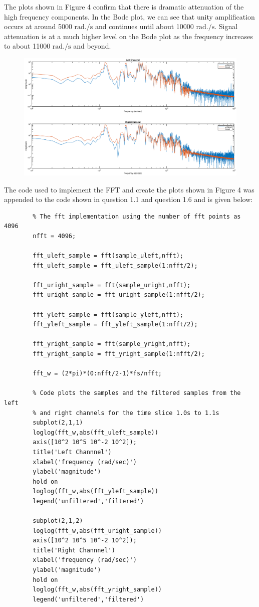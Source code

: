 \documentclass{article}
\begin{document}
	The plots shown in Figure 4 confirm that there is dramatic attenuation of the high frequency components. In the Bode plot, we can see that unity amplification occurs at around 5000 $\si{\radian.\per\second}$ and continues until about 10000 $\si{\radian.\per\second}$. Signal attenuation is at a much higher level on the Bode plot as the frequency increases to about 11000 $\si{\radian.\per\second}$ and beyond. 
	
	 \begin{figure}[H]
	 	\hspace*{-1.5cm}
	 	\includegraphics[scale=0.37]{fig4.eps}
	 \end{figure}
	
	\newpage
	The code used to implement the FFT and create the plots shown in Figure 4 was appended to the code shown in question 1.1 and question 1.6 and is given below:
	
	\begin{lstlisting}
		% The fft implementation using the number of fft points as 4096
		nfft = 4096;
			
		fft_uleft_sample = fft(sample_uleft,nfft);
		fft_uleft_sample = fft_uleft_sample(1:nfft/2);
		
		fft_uright_sample = fft(sample_uright,nfft);
		fft_uright_sample = fft_uright_sample(1:nfft/2);
		
		fft_yleft_sample = fft(sample_yleft,nfft);
		fft_yleft_sample = fft_yleft_sample(1:nfft/2);
		
		fft_yright_sample = fft(sample_yright,nfft);
		fft_yright_sample = fft_yright_sample(1:nfft/2);
		
		fft_w = (2*pi)*(0:nfft/2-1)*fs/nfft;
		
		% Code plots the samples and the filtered samples from the left 
		% and right channels for the time slice 1.0s to 1.1s
		subplot(2,1,1)
		loglog(fft_w,abs(fft_uleft_sample))
		axis([10^2 10^5 10^-2 10^2]);
		title('Left Channnel')
		xlabel('frequency (rad/sec)')
		ylabel('magnitude')
		hold on
		loglog(fft_w,abs(fft_yleft_sample))
		legend('unfiltered','filtered')
		
		subplot(2,1,2)
		loglog(fft_w,abs(fft_uright_sample))
		axis([10^2 10^5 10^-2 10^2]);
		title('Right Channnel')
		xlabel('frequency (rad/sec)')
		ylabel('magnitude')
		hold on
		loglog(fft_w,abs(fft_yright_sample))
		legend('unfiltered','filtered')
	\end{lstlisting}
\end{document}
